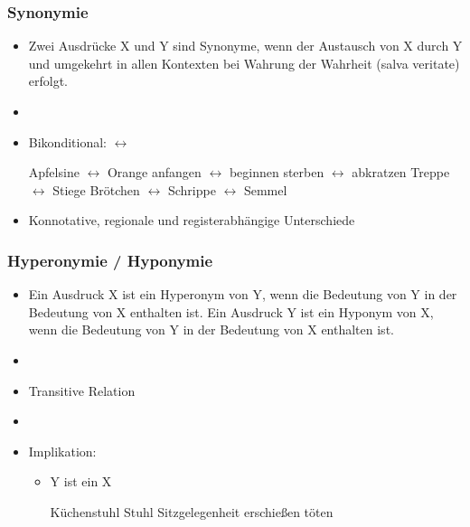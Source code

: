 
\begin{frame}
\frametitle{Synonymie}

\begin{itemize}
	\item Zwei Ausdrücke X und Y sind Synonyme, wenn der Austausch von X durch Y und umgekehrt in allen Kontexten bei Wahrung der Wahrheit (salva veritate) erfolgt.
	\item[]
	\item Bikonditional: $\leftrightarrow$
	
	\eal
		\ex Apfelsine $\leftrightarrow$ Orange
		\ex anfangen $\leftrightarrow$ beginnen
		\ex sterben $\leftrightarrow$ abkratzen
		\ex Treppe $\leftrightarrow$ Stiege
		\ex Brötchen $\leftrightarrow$ Schrippe $\leftrightarrow$ Semmel
	\zl
	
	\item Konnotative, regionale und registerabhängige Unterschiede
\end{itemize}

\end{frame}



\begin{frame}
\frametitle{Hyperonymie / Hyponymie}

\begin{itemize}
	\item 
Ein Ausdruck X ist ein Hyperonym von Y, wenn die Bedeutung von Y in der Bedeutung von X enthalten ist.
Ein Ausdruck Y ist ein Hyponym von X, wenn die Bedeutung von Y in der Bedeutung von X enthalten ist.
	\item[]	
	\item Transitive Relation
	\item[]
	\item Implikation: \ras
	
	\begin{itemize}
		\item Y ist ein X
		
		\eal 
		\ex Küchenstuhl \ras Stuhl \ras Sitzgelegenheit
		\ex erschie\ss{}en \ras töten
		\zl
		
	\end{itemize}
	
\end{itemize}

\end{frame}



